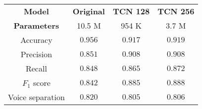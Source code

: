 \begin{tabular}{c|ccc}
    \textbf{Model}      & \textbf{Original} & \textbf{TCN 128} & \textbf{TCN 256} \\
    \textbf{Parameters} & 10.5 M           & 954 K            & 3.7 M            \\\hline
    Accuracy            & $\mathbf{0.956}$ & $0.917$          & $0.919$          \\
    Precision           & $0.851$          & $\mathbf{0.908}$ & $\mathbf{0.908}$ \\
    Recall              & $0.848$          & $0.865$          & $\mathbf{0.872}$ \\
    $F_1$ score         & $0.842$          & $0.885$          & $\mathbf{0.888}$ \\
    Voice separation    & $\mathbf{0.820}$ & $0.805$          & $0.806$          \\
\end{tabular}